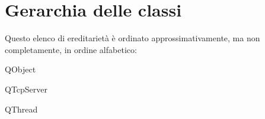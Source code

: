 \section{Gerarchia delle classi}
Questo elenco di ereditarietà è ordinato approssimativamente, ma non completamente, in ordine alfabetico\-:\begin{DoxyCompactList}
\item Q\-Object\begin{DoxyCompactList}
\item {}
\begin{DoxyCompactList}
\item {}
\end{DoxyCompactList}
\end{DoxyCompactList}
\item Q\-Tcp\-Server\begin{DoxyCompactList}
\item {}
\end{DoxyCompactList}
\item Q\-Thread\begin{DoxyCompactList}
\item {}
\begin{DoxyCompactList}
\item {}
\item {}
\end{DoxyCompactList}
\item {}
\item {}
\end{DoxyCompactList}
\end{DoxyCompactList}
